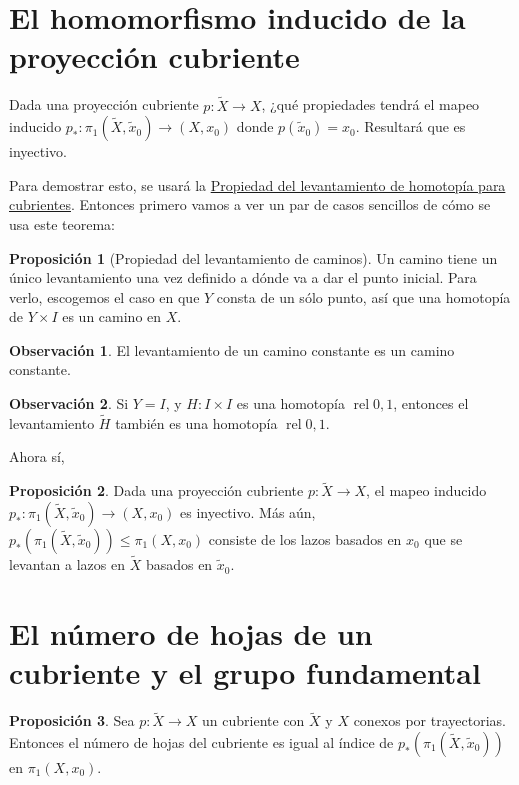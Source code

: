 \documentclass[spanish]{book}
\theoremstyle{definition}
\newtheorem*{obs}{Observación}
\newtheorem*{prop}{Proposición}
\DeclareMathOperator{\rel}{rel}
\begin{document}
\section{El homomorfismo inducido de la proyección cubriente}
Dada una proyección cubriente $p:\tilde{X}\to X$, ¿qué propiedades tendrá el mapeo inducido $p_*:\pi_1(\tilde{X},\tilde{x}_0)\to (X,x_0)$ donde $p(\tilde{x}_0)=x_0$. Resultará que es inyectivo.

Para demostrar esto, se usará la \hyperref[teo-lhc]{Propiedad del levantamiento de homotopía para cubrientes}. Entonces primero vamos a ver un par de casos sencillos de cómo se usa este teorema:
\begin{prop}[Propiedad del levantamiento de caminos]
	Un camino tiene un único levantamiento una vez definido a dónde va a dar el punto inicial. Para verlo, escogemos el caso en que $Y$ consta de un sólo punto, así que una homotopía de $Y\times I$ es un camino en $X$.
\end{prop}
\begin{obs}
	El levantamiento de un camino constante es un camino constante.
\end{obs}
\begin{obs}
	Si $Y=I$, y $H:I\times I$ es una homotopía $\rel 0,1$, entonces el levantamiento $\tilde{H}$ también es una homotopía $\rel 0,1$.
\end{obs}
Ahora sí,
\begin{prop}
	Dada una proyección cubriente $p:\tilde{X}\to X$, el mapeo inducido $p_*:\pi_1(\tilde{X},\tilde{x}_0)\to (X,x_0)$ es inyectivo. Más aún, $p_*\left(\pi_1(\tilde{X},\tilde{x}_0)\right)\leq\pi_1(X,x_0)$ consiste de los lazos basados en $x_0$ que se levantan a lazos en $\tilde{X}$ basados en $\tilde{x}_0$.
\end{prop}
\section{El número de hojas de un cubriente y el grupo fundamental}
\begin{prop}
	Sea $p:\tilde{X}\to X$ un cubriente con $\tilde{X}$ y $X$ conexos por trayectorias. Entonces el número de hojas del cubriente es igual al índice de $p_*(\pi_1(\tilde{X},\tilde{x}_0))$ en $\pi_1(X,x_0)$.
\end{prop}
\end{document}
